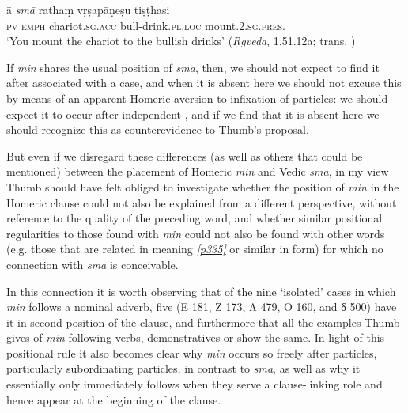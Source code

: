 \begin{exe}
\ex \gll ā \emph{smā} rathaṃ vṛṣapāṇeṣu tiṣṭhasi \\
\textsc{pv} \textsc{emph} chariot.\textsc{sg.acc} bull-drink.\textsc{pl.loc} mount.\textsc{2.sg.pres.} \\
\trans `You mount the chariot to the bullish drinks' 
(\textit{\d{R}gveda}, 1.51.12a; trans. \citealt[1417]{JamisonBrereton2014})
\label{RV_ex2}
\end{exe}%

If \emph{min} shares the usual position of \emph{sma}, then, we should not expect to find it after  associated with a case, and when it is absent here we should not excuse this by means of an apparent Homeric aversion to infixation of particles: we should expect it to occur after independent , and if we find that it is absent here we should recognize this as counterevidence to Thumb's proposal.

But even if we disregard these differences (as well as others that could be mentioned) between the placement of Homeric \emph{min} and Vedic \emph{sma}, in my view Thumb should have felt obliged to investigate whether the position of \emph{min} in the Homeric clause could not also be explained from a different perspective, without reference to the quality of the preceding word, and whether similar positional regularities to those found with \emph{min} could not also be found with other words (e.g. those that are related in meaning \hyperlink{p335}{\emph{[p335]}} or similar in form) for which no connection with \emph{sma} is conceivable.

In this connection it is worth observing that of the nine `isolated' cases in which \emph{min} follows a nominal adverb, five (Ε 181, Ζ 173, Λ 479, Ο 160, and δ 500) have it in second position of the clause, and furthermore that all the examples Thumb gives of \emph{min} following verbs, demonstratives or  show the same. In light of this positional rule it also becomes clear why \emph{min} occurs so freely after particles, particularly subordinating particles, in contrast to \emph{sma}, as well as why it essentially only immediately follows  when they serve a clause-linking role and hence appear at the beginning of the clause.

